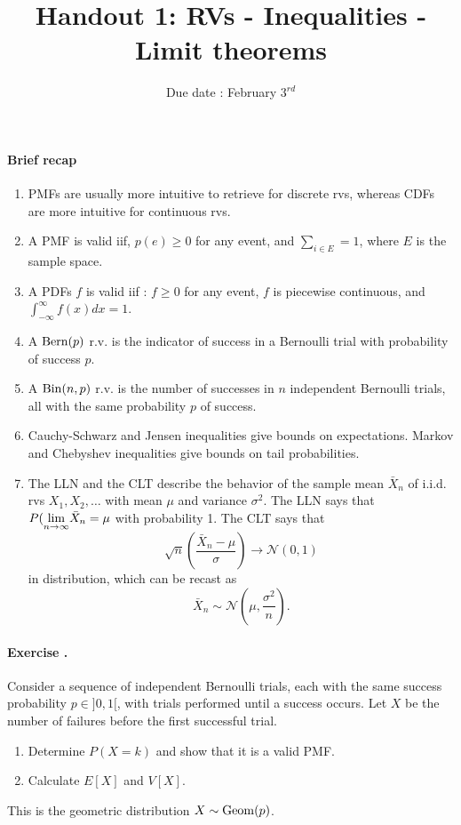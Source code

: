 \documentclass[twocolumn,12pt,a4paper]{article}
\title{ \bfseries \Huge {Handout 1: RVs - Inequalities - Limit theorems }}
\date{Due date : February $3^{rd}$}
\newcommand{\calN}{\mathcal N}
\newcounter{num}  %
\begin{document}
	\maketitle
\setcounter{num}{1}  %

\thispagestyle{empty} 
	\paragraph{Brief recap}
	\begin{enumerate}
		\item PMFs are usually more intuitive to retrieve for discrete rvs, whereas CDFs are more intuitive for continuous rvs.
		\item A PMF is valid iif, $p(e)\geq 0$ for any event, and $\sum_{i\in E} = 1$, where $E$ is the sample space.
		\item A PDFs $f$ is valid iif : $f\geq 0$ for any event, $f$ is piecewise continuous, and $\int_{-\infty}^\infty f(x)dx = 1$.
		\item A ${\rm Bern}(p)$ r.v. is the indicator of success in a Bernoulli trial with probability of success $p$.
		\item A ${\rm Bin}(n, p)$ r.v. is the number of successes in $n$ independent Bernoulli trials, all with the same probability $p$ of success.
		\item Cauchy-Schwarz and Jensen inequalities give bounds on expectations. 
		Markov and Chebyshev inequalities give bounds
		on tail probabilities.
		\item The LLN and the CLT describe the behavior of the sample mean $\bar{X}_n$ of i.i.d. rvs $X_1, X_2, \dots$ with mean $\mu$ and variance $\sigma^2$. The LLN says that $P(\underset{n\rightarrow\infty}{\rm lim}\bar{X}_n = \mu$ with probability 1. 
		The CLT says that 
		$$
		\sqrt{n} \left( \frac{\bar{X}_n - \mu}{\sigma} \right) \rightarrow \calN(0, 1)
		$$
		in distribution, which can be recast as
		$$
		\bar{X}_n \sim \calN\left(\mu, \frac{\sigma^2}{n}\right).
		$$
	\end{enumerate}
	\paragraph{Exercise \thenum.}
	Consider a sequence of independent Bernoulli trials, each with the same success probability $p \in ]0, 1[$, with trials performed until a success occurs. Let $X$ be the number of failures before the first successful trial. 
	\begin{enumerate}
		\item Determine $P (X = k)$ and show that it is a valid PMF.
		\item Calculate $E[X]$ and $V[X]$.
	\end{enumerate}
	This is the geometric distribution $X\sim {\rm Geom}(p)$.
\end{document}
